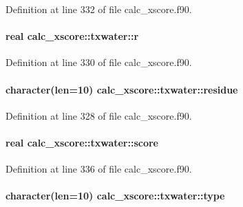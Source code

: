 Definition at line 332 of file calc\-\_\-xscore.\-f90.

\hypertarget{structcalc__xscore_1_1txwater_a3df282d5e86e22834d440fe62220ab96}{
\paragraph[{r}]{\setlength{\rightskip}{0pt plus 5cm}real calc\-\_\-xscore\-::txwater\-::r}}\label{structcalc__xscore_1_1txwater_a3df282d5e86e22834d440fe62220ab96}


Definition at line 330 of file calc\-\_\-xscore.\-f90.

\hypertarget{structcalc__xscore_1_1txwater_ad8f5a046d443c8f1acd26f78f23c0684}{
\paragraph[{residue}]{\setlength{\rightskip}{0pt plus 5cm}character(len=10) calc\-\_\-xscore\-::txwater\-::residue}}\label{structcalc__xscore_1_1txwater_ad8f5a046d443c8f1acd26f78f23c0684}


Definition at line 328 of file calc\-\_\-xscore.\-f90.

\hypertarget{structcalc__xscore_1_1txwater_a4eb1dc1bb8449e5e81e5f1f1571a2063}{
\paragraph[{score}]{\setlength{\rightskip}{0pt plus 5cm}real calc\-\_\-xscore\-::txwater\-::score}}\label{structcalc__xscore_1_1txwater_a4eb1dc1bb8449e5e81e5f1f1571a2063}


Definition at line 336 of file calc\-\_\-xscore.\-f90.

\hypertarget{structcalc__xscore_1_1txwater_a057e100854a627834189ea3b519cd309}{
\paragraph[{type}]{\setlength{\rightskip}{0pt plus 5cm}character(len=10) calc\-\_\-xscore\-::txwater\-::type}}\label{structcalc__xscore_1_1txwater_a057e100854a627834189ea3b519cd309}


